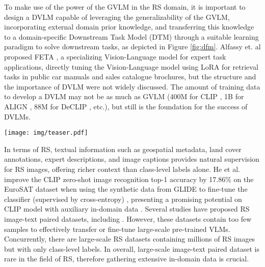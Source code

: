 \documentclass[journal]{IEEEtran}
\begin{document}
To make use of the power of the GVLM in the RS domain, it is important to design a DVLM capable of leveraging the generalizability of the GVLM, incorporating external domain prior knowledge, and transferring this knowledge to a domain-specific Downstream Task Model (DTM) through a suitable learning paradigm to solve downstream tasks, as depicted in Figure \ref{fig:dfm}. Alfassy et. al proposed FETA \cite{alfassy2022feta}, a specializing Vision-Language model for expert task applications, directly tuning the Vision-Language model using LoRA for retrieval tasks in public car manuals and sales catalogue brochures, but the  structure and the importance of DVLM were not widely discussed. The amount of training data to develop a DVLM may not be as much as GVLM (400M for CLIP \cite{clip}, 1B for ALIGN \cite{align}, 88M for DeCLIP \cite{declip}, etc.), but still is the foundation for the success of DVLMs. 

\begin{figure*}
    \centering
\texttt{[image: img/teaser.pdf]}
    \caption{Illustration of our proposed Framework. The Domain Vision-Language Model (DVLM) plays a central role in accepting the general knowledge from the General Vision-Language Model (GVLM) and is injected with massive domain-specific knowledge from external data. With the proper learning paradigm, DVLM is able to transfer the general knowledge with domain-specific prior to the Downstream Task Model (DTM) for domain-specific tasks. A demo for our proposed RS5M dataset is on the left.}
    \label{fig:dfm}
\end{figure*}

In terms of RS, textual information such as geospatial metadata, land cover annotations, expert descriptions, and image captions provides natural supervision for RS images, offering richer context than class-level labels alone. He et al. improve the CLIP zero-shot image recognition top-1 accuracy by 17.86\% on the EuroSAT dataset when using the synthetic data from GLIDE to fine-tune the classifier (supervised by cross-entropy) \cite{wortsman2022robust}, presenting a promising potential on CLIP model with auxiliary in-domain data \cite{synthetic}. Several studies have proposed RS image-text paired datasets, including \cite{UCMSydeney} \cite{UCMSydeney} \cite{RSICD} \cite{RSITMD} \cite{rsvg}. However, these datasets contain too few samples to effectively transfer or fine-tune large-scale pre-trained VLMs. Concurrently, there are large-scale RS datasets \cite{millionaid} \cite{ben} \cite{fmow} containing millions of RS images but with only class-level labels. In overall, large-scale image-text paired dataset is rare in the field of RS, therefore gathering extensive in-domain data is crucial. 
\end{document}

